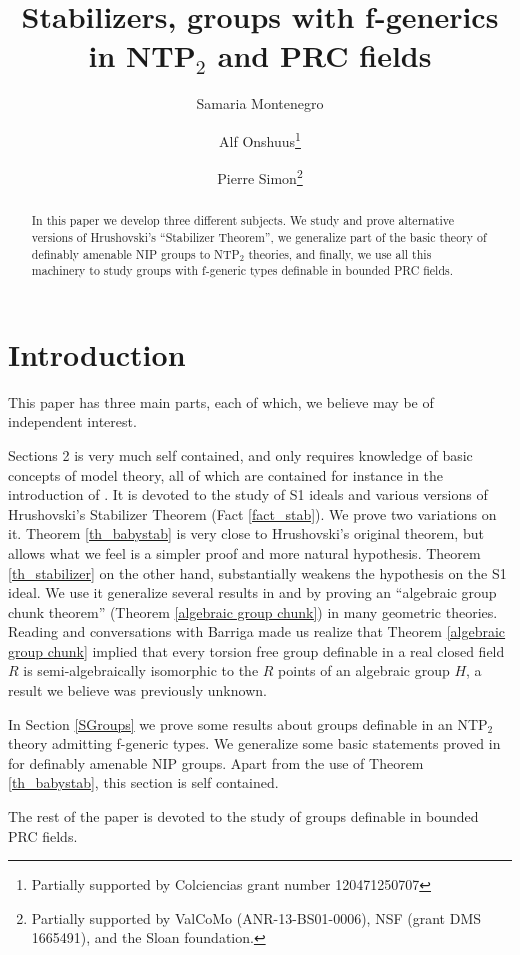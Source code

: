 \documentclass[12pt]{article}
\title{Stabilizers, groups with f-generics in NTP$_2$ and PRC fields}
\author{Samaria Montenegro\footnotemark[1] \and Alf Onshuus\thanks{Partially supported by Colciencias grant number 120471250707}
 \and Pierre Simon\footnote{Partially supported by ValCoMo
(ANR-13-BS01-0006), NSF (grant DMS
1665491), and the Sloan foundation.}}
\date{}
\theoremstyle{definition}
\theoremstyle{mystyle}
\theoremstyle{remark}
\begin{document}
\maketitle

\begin{abstract}In this paper we develop three different subjects. We study and
prove alternative versions of Hrushovski's ``Stabilizer Theorem'',
we generalize part of the basic theory of definably amenable NIP
groups to NTP$_2$ theories, and finally, we use all this machinery
to study groups with f-generic types definable in bounded PRC
fields. \end{abstract}


\section{Introduction}


This paper has three main parts, each of which, we believe may be
of independent interest.

Sections 2 is very much self contained, and only
requires knowledge of basic concepts of model theory, all
of which are contained for instance in the introduction of \cite{HrPi}.
It is devoted to the study of S1 ideals and
various versions of Hrushovski's Stabilizer Theorem (Fact
\ref{fact_stab}). We prove two variations on it. Theorem
\ref{th_babystab} is very close to Hrushovski's original theorem, but
 allows what we feel is a simpler proof and more natural hypothesis. Theorem
\ref{th_stabilizer} on the other hand, substantially weakens the
hypothesis on the S1 ideal. We use it generalize several results in \cite{HrPi}
and \cite{Ba} by proving an ``algebraic group chunk theorem''
(Theorem \ref{algebraic group chunk}) in many geometric theories.
Reading \cite{Ba} and conversations with Barriga made us realize
that Theorem \ref{algebraic group chunk} implied that every
torsion free group definable in a real closed field $R$ is
semi-algebraically isomorphic to the $R$ points of an algebraic
group $H$, a result we believe was previously unknown.

In Section \ref{SGroups} we prove some results about groups
definable in an NTP$_2$ theory admitting f-generic types. We
generalize some basic statements proved in \cite{CS} for definably
amenable NIP groups. Apart from the use of Theorem \ref{th_babystab}, this section
is self contained.

The rest of the paper is devoted to the study of groups definable in
bounded PRC fields.
\end{document}
